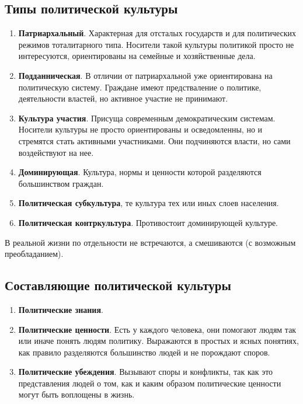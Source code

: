 \documentclass[12pt]{article}
\begin{document}
	\subsection{Типы политической культуры}
	\begin{enumerate}
		\item \textbf{Патриархальный}. Характерная для отсталых государств и для политических режимов тоталитарного типа. Носители такой культуры политикой просто не интересуются, ориентированы на семейные и хозяйственные дела.
		\item \textbf{Подданническая}. В отличии от патриархальной уже ориентирована на политическую систему. Граждане имеют предстваление о политике, деятельности властей, но активное участие не принимают.
		\item \textbf{Культура участия}. Присуща современным демократическим системам. Носители культуры не просто ориентированы и осведомленны, но и стремятся стать активными участниками. Они подчиняются власти, но сами воздействуют на нее.
		\item \textbf{Доминирующая}. Культура, нормы и ценности которой разделяются большинством граждан.
		\item \textbf{Политическая субкультура}, те культура тех или иных слоев населения.
		\item \textbf{Политическая контркультура}. Противостоит доминирующей культуре.
	\end{enumerate}
	
	\begin{note}
		В реальной жизни по отдельности не встречаются, а смешиваются (с возможным преобладанием).
	\end{note}
	
	\subsection{Составляющие политической культуры}
	\begin{enumerate}
		\item \textbf{Политические знания}.
		\item \textbf{Политические ценности}. Есть у каждого человека, они помогают людям так или иначе понять людям политику. Выражаются в простых и ясных понятиях, как правило разделяются большинство людей и не порождают споров.
		\item \textbf{Политические убеждения}. Вызывают споры и конфликты, так как это представления людей о том, как и каким образом политические ценности могут быть воплощены в жизнь.
	\end{enumerate}
	
\end{document}
